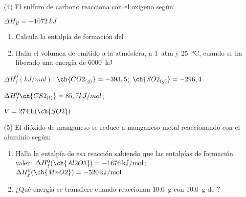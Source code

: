 \documentclass[10pt]{article}
\newenvironment{gexdatos}{
      \noindent\makebox[0pt][r]{\textit{Datos:}}
    }{\vspace{5pt}}
\begin{document}
\begin{multicols}{2}
\begin{exercise}[
    tags    = {},
    topics  = {química, termodinámica, termoquímica},
    source  = {FQ 1B MGH 2016, p179, e4},
  ]
  (4) El sulfuro de carbono reacciona con el oxígeno según:

   \( \Delta H_R = \SI{-1072}{kJ} \)

  \begin{enumerate}
    \item Calcula la entalpía de formación del 
    \item Halla el volumen de  emitido a la atmósfera, a \SI{1}{atm} y \SI{25}{\celsius}, cuando se ha liberado una energía de \SI{6000}{kJ}
  \end{enumerate}

  \begin{gexdatos}
    \( \Delta H^0_f (\si{kJ/mol}) \): \( \ch{CO2_{(g)}} = -393,5 \); \( \ch{SO2_{(g)}} = -296,4 \).
  \end{gexdatos}

\end{exercise}

\begin{solution}
  \begin{enumerate*}
    \item \( \Delta H^0_f \ch{CS2_{(l)}} = 85,7 kJ/mol \); \item \( V = \SI{274}{\liter} (\ch{SO2}) \)
  \end{enumerate*}
\end{solution}




\begin{exercise}[
    tags    = {},
    topics  = {química, termodinámica, termoquímica},
    source  = {FQ 1B MGH 2016, p179, e5},
  ]
  (5) El dióxido de manganeso se reduce a manganeso metal reaccionando
  con el aluminio según:


  \begin{enumerate}
    \item Halla la entalpía de esa reacción sabiendo que las entalpías
    de formación valen:
    \( \Delta H^0_f (\ch{Al2O3}) = \SI{-1676}{kJ/mol} \); \( \Delta H^0_f (\ch{MnO2}) = \SI{-520}{kJ/mol} \)
    \item ¿Qué energía se transfiere cuando reaccionan \SI{10.0}{\gram}
     con \SI{10.0}{\gram} de ?
  \end{enumerate}
\end{exercise}


\end{multicols}
\end{document}
